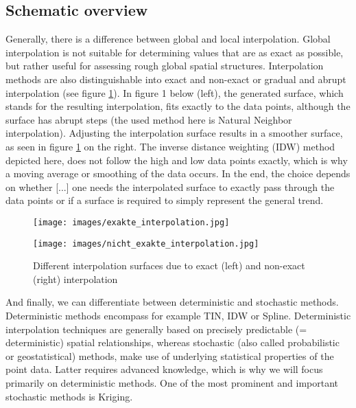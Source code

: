 \subsection{Schematic overview}

Generally, there is a difference between global and local interpolation. Global interpolation is not suitable for determining values that are as exact as possible, but rather useful for assessing rough global spatial structures. \cite{gitta_raumliche_2016}
Interpolation methods are also distinguishable into exact and non-exact or gradual and abrupt interpolation (see figure \ref{fig:exact_non_exact_interploation}). In figure 1 below (left), the generated surface, which stands for the resulting interpolation, fits exactly to the data points, although the surface has abrupt  \ldq{}steps\rdq{} (the used method here is Natural Neighbor interpolation). Adjusting the interpolation surface results in a smoother surface, as seen in figure \ref{fig:exact_non_exact_interploation} on the right.
The inverse distance weighting (IDW) method depicted here, does not follow the high and low data points exactly, which is why a \ldq{}moving average\rdq{} or \ldq{}smoothing\rdq{} of the data occurs. In the end, the choice depends on whether  \ldq{}[...] one needs the interpolated surface to exactly pass through the data points or if a surface is required to simply represent the general trend\rdq{}. \cite{wyatt_interpolation_nodate}



\begin{figure}
	\begin{minipage}[b]{.48\linewidth}
		\texttt{[image: images/exakte\_interpolation.jpg]}
	\end{minipage}
	\hfill
	\begin{minipage}[b]{.48\linewidth}
		\texttt{[image: images/nicht\_exakte\_interpolation.jpg]}
	\end{minipage}
	\caption{Different interpolation surfaces due to exact (left) and non-exact (right) interpolation\cite{gitta_raumliche_2016}}
	\label{fig:exact_non_exact_interploation}
\end{figure}

And finally, we can differentiate between deterministic and stochastic methods.\cite{gitta_raumliche_2016}
Deterministic methods encompass for example \ldq{}TIN\rdq{}, \ldq{}IDW\rdq{} or \ldq{}Spline\rdq{}. \cite{wasser_going_2020} Deterministic interpolation techniques are generally based on precisely predictable (= deterministic) spatial relationships, whereas stochastic (also called probabilistic or geostatistical) methods, make use of underlying statistical properties of the point data. Latter requires advanced knowledge, which is why we will focus primarily on deterministic methods. One of the most prominent and important stochastic methods is Kriging.

